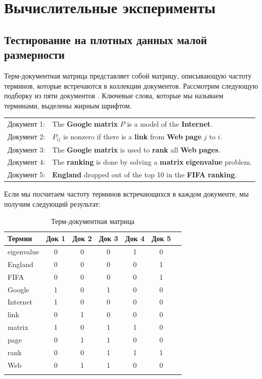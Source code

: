 
\newpage
\chapter{Вычислительные эксперименты}





\section{Тестирование на плотных данных малой размерности}

Терм-документная матрица представляет собой матрицу, описывающую частоту терминов,
которые встречаются в коллекции документов.
Рассмотрим следующую подборку из пяти документов \cite{elden}.
Ключевые слова, которые мы называем терминами,
выделены жирным шрифтом.

\begin{longtable*}{ l p{12cm} }
 Документ 1: & The \textbf{Google} \textbf{matrix} $P$ is a model of the \textbf{Internet}. \\
 Документ 2: & $P_{ij}$ is nonzero if there is a \textbf{link} from \textbf{Web} \textbf{page} $j$ to $i$.\\
 Документ 3: & The \textbf{Google} \textbf{matrix} is used to \textbf{rank} all \textbf{Web} \textbf{pages}.\\
 Документ 4: & The \textbf{ranking} is done by solving a \textbf{matrix} \textbf{eigenvalue} problem.\\
 Документ 5: & \textbf{England} dropped out of the top 10 in the \textbf{FIFA} \textbf{ranking}.\\
\end{longtable*}

Если мы посчитаем частоту терминов встречающихся в каждом документе, мы получим следующий результат:

 \begin{longtable}{ l | c c c c c c }
 Термин      & Док 1 & Док 2 & Док 3 & Док 4 & Док 5 \\
 \hline
 eigenvalue  & 0 & 0 & 0 & 1 & 0 \\
 England     & 0 & 0 & 0 & 0 & 1 \\
 FIFA        & 0 & 0 & 0 & 0 & 1 \\
 Google      & 1 & 0 & 1 & 0 & 0 \\
 Internet    & 1 & 0 & 0 & 0 & 0 \\
 link        & 0 & 1 & 0 & 0 & 0 \\
 matrix      & 1 & 0 & 1 & 1 & 0 \\
 page        & 0 & 1 & 1 & 0 & 0 \\
 rank        & 0 & 0 & 1 & 1 & 1 \\
 Web         & 0 & 1 & 1 & 0 & 0 \\
 \caption{Терм-документная матрица}
\end{longtable}

